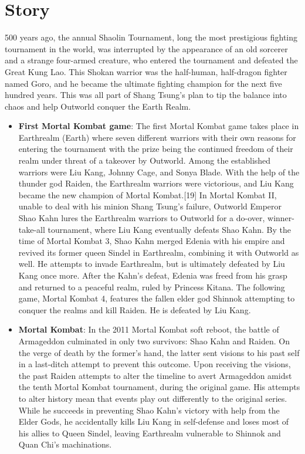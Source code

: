 \documentclass[12pt]{article}
\begin{document}
\section{Story}
500 years ago, the annual Shaolin Tournament, long the most prestigious fighting tournament in the world, was interrupted by the appearance of an old sorcerer and a strange four-armed creature, who entered the tournament and defeated the Great Kung Lao. This Shokan warrior was the half-human, half-dragon fighter named Goro, and he became the ultimate fighting champion for the next five hundred years. This was all part of Shang Tsung's plan to tip the balance into chaos and help Outworld conquer the Earth Realm.
\begin{itemize}
    \item \textbf{First Mortal Kombat game}: The first Mortal Kombat game takes place in Earthrealm (Earth) where seven different warriors with their own reasons for entering the tournament with the prize being the continued freedom of their realm under threat of a takeover by Outworld. Among the established warriors were Liu Kang, Johnny Cage, and Sonya Blade. With the help of the thunder god Raiden, the Earthrealm warriors were victorious, and Liu Kang became the new champion of Mortal Kombat.[19] In Mortal Kombat II, unable to deal with his minion Shang Tsung's failure, Outworld Emperor Shao Kahn lures the Earthrealm warriors to Outworld for a do-over, winner-take-all tournament, where Liu Kang eventually defeats Shao Kahn. By the time of Mortal Kombat 3, Shao Kahn merged Edenia with his empire and revived its former queen Sindel in Earthrealm, combining it with Outworld as well. He attempts to invade Earthrealm, but is ultimately defeated by Liu Kang once more. After the Kahn's defeat, Edenia was freed from his grasp and returned to a peaceful realm, ruled by Princess Kitana. The following game, Mortal Kombat 4, features the fallen elder god Shinnok attempting to conquer the realms and kill Raiden. He is defeated by Liu Kang.
    
    \item \textbf{Mortal Kombat}: In the 2011 Mortal Kombat soft reboot, the battle of Armageddon culminated in only two survivors: Shao Kahn and Raiden. On the verge of death by the former's hand, the latter sent visions to his past self in a last-ditch attempt to prevent this outcome. Upon receiving the visions, the past Raiden attempts to alter the timeline to avert Armageddon amidst the tenth Mortal Kombat tournament, during the original game. His attempts to alter history mean that events play out differently to the original series. While he succeeds in preventing Shao Kahn's victory with help from the Elder Gods, he accidentally kills Liu Kang in self-defense and loses most of his allies to Queen Sindel, leaving Earthrealm vulnerable to Shinnok and Quan Chi's machinations.
    

\end{itemize}
\end{document}
